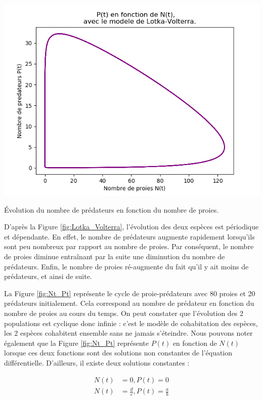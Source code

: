 \begin{minipage}[c]{.46\linewidth}
    \centering
    \includegraphics[width=\linewidth]{images/Lotka_Volterra_Pt_Nt.png}
    \captionsetup{type=figure}\caption{Évolution du nombre de prédateurs en fonction du nombre de proies.}
    \label{fig:Nt_Pt}
\end{minipage}
\hfill
\vspace{4.00mm}



D'après la Figure \ref{fig:Lotka_Volterra}, l'évolution des deux espèces est périodique et dépendante. En effet, le nombre de prédateurs augmente rapidement lorsqu'ils sont peu nombreux par rapport au nombre de proies. Par conséquent, le nombre de proies diminue entraînant par la suite une diminution du nombre de prédateurs. Enfin, le nombre de proies ré-augmente du fait qu'il y ait moins de prédateurs, et ainsi de suite.  

La Figure \ref{fig:Nt_Pt} représente le cycle de proie-prédateurs avec 80 proies et 20 prédateurs initialement. Cela correspond au nombre de prédateur en fonction du nombre de proies au cours du temps. On peut constater que l'évolution des 2 populations est cyclique donc infinie : c'est le modèle de cohabitation des espèces, les 2 espèces cohabitent ensemble sans ne jamais s'éteindre. Nous pouvons noter également que la Figure \ref{fig:Nt_Pt} représente $P(t)$ en fonction de $N(t)$ lorsque ces deux fonctions sont des solutions non constantes de l'équation différentielle. D'ailleurs, il existe deux solutions constantes :

\begin{align}
    N(t) &= 0, P(t)=0  \\
    N(t) &= \frac{d}{c}, P(t)=\frac{a}{b}
\end{align}

